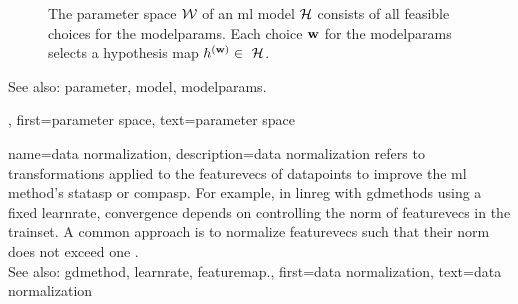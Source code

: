 {{\begin{figure}[H]
\begin{center}
			\end{center} 
			\caption{The \gls{parameter} space $\mathcal{W}$ of an \gls{ml} \gls{model} $\mathcal{H}$ consists of all 
			feasible choices for the \gls{modelparams}. Each choice ${\bf w}$ for the \gls{modelparams} 
			selects a \gls{hypothesis} \gls{map} $\hypothesis^{(\weights)} \in \hypospace$.
				 \label{fig_param_space_dict}} 
			\end{figure}
			See also: \gls{parameter}, \gls{model}, \gls{modelparams}.},
		first={parameter space},
		text={parameter space}
}

{name={data normalization},
	description={\Gls{data} normalization refers to transformations 
		applied to the \glspl{featurevec} of \glspl{datapoint} to improve the \gls{ml} method's 
		\gls{statasp} or \gls{compasp}. For example, in \gls{linreg} with \glspl{gdmethod} using 
		a fixed \gls{learnrate}, \gls{convergence} depends on controlling the \gls{norm} of \glspl{featurevec} 
		in the \gls{trainset}. A common approach is to normalize \glspl{featurevec} such that their 
		\gls{norm} does not exceed one \cite[Ch.\ 5]{MLBasics}.
				\\
		See also:  \gls{gdmethod}, \gls{learnrate}, \gls{featuremap}.},
	first={data normalization},
	text={data normalization}
}

